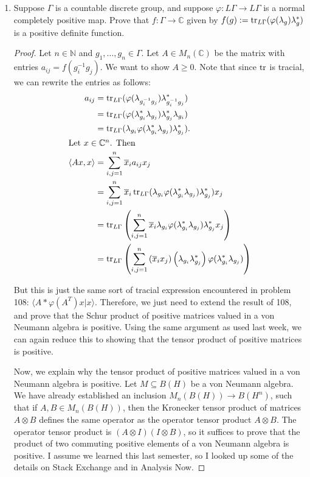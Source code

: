 \documentclass[a4paper,10pt]{report}
\newcommand{\ggen}[1]{\langle#1\rangle}
\newcommand{\ol}[1]{\overline{#1}}
\newcommand{\N}{\mathbb{N}}
\newcommand{\C}{\mathbb{C}}
\newcommand{\tens}{\otimes}
\begin{document}
\begin{enumerate}
\begin{enumerate}
		\end{enumerate}
	\item	Suppose $\Gamma$ is a countable discrete group,
		and suppose $\varphi : L\Gamma \to L\Gamma$ is a normal completely positive map.
		Prove that $f : \Gamma \to \C$ given by $f(g) := \operatorname{tr}_{L\Gamma}(\varphi(\lambda_g)\lambda_g^*)$
		is a positive definite function.
		\begin{proof}
			Let $n \in \N$ and $g_1, \dots, g_n \in \Gamma$.
			Let $A \in M_n(\C)$ be the matrix with entries $a_{ij} = f(g_i^{-1}g_j)$.
			We want to show $A \ge 0$.
			Note that since $\operatorname{tr}$ is tracial, we can rewrite the entries as follows:
			\begin{align*}
				a_{ij} & = \tr_{L\Gamma}(\varphi(\lambda_{g_i^{-1}g_j})\lambda_{g_i^{-1}g_j}^*) \\
				 & = \tr_{L\Gamma}(\varphi(\lambda_{g_i}^* \lambda_{g_j})
				 \lambda_{g_j}^*\lambda_{g_i}) \\
				 & = \tr_{L\Gamma}(\lambda_{g_i}\varphi(\lambda_{g_i}^* \lambda_{g_j})
				 \lambda_{g_j}^*). \\
			\intertext{Let $x \in \C^n$. Then}
				\ggen{Ax, x} & = \sum_{i,j=1}^n{\ol{x}_i a_{ij} x_j} \\
				 & = \sum_{i,j=1}^n{\ol{x}_i \tr_{L\Gamma}(\lambda_{g_i}
				 \varphi(\lambda_{g_i}^* \lambda_{g_j})\lambda_{g_j}^*) x_j} \\
				 & = \tr_{L\Gamma}\left( \sum_{i,j=1}^n{\ol{x}_i \lambda_{g_i}
				 \varphi(\lambda_{g_i}^* \lambda_{g_j})\lambda_{g_j}^* x_j} \right) \\
				 & = \tr_{L\Gamma}\left( \sum_{i,j=1}^n{
				 \left( \ol{x}_i x_j \right)
				\left( \lambda_{g_i} \lambda_{g_j}^* \right)
				\varphi(\lambda_{g_i}^* \lambda_{g_j})} \right)
			\end{align*}

			But this is just the same sort of tracial expression encountered in problem 108: $\ggen{A\ast\varphi(A^T)x|x}$. Therefore, we just need to extend the result of 108, and prove that the Schur product of positive matrices valued in a von Neumann algebra is positive. Using the same argument as used last week, we can again reduce this to showing that the tensor product of positive matrices is positive. 
			
			Now, we explain why the tensor product of positive matrices valued in a von Neumann algebra is positive. Let $M\subseteq B(H)$ be a von Neumann algebra. We have already established an inclusion $M_n(B(H))\to B(H^n)$, such that if $A,B\in M_n(B(H))$, then the Kronecker tensor product of matrices $A\tens B$ defines the same operator as the operator tensor product $A\tens B$. The operator tensor product is $(A\tens I)(I\tens B)$, so it suffices to prove that the product of two commuting positive elements of a von Neumann algebra is positive. I assume we learned this last semester, so I looked up some of the details on Stack Exchange and in Analysis Now. 
		

\end{proof}
\end{enumerate}
\end{document}
